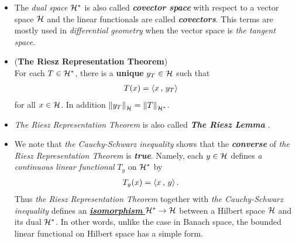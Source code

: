 \documentclass[11pt]{article}
\begin{document}
\begin{itemize}
\item \begin{remark}
The \emph{dual space} ${\mathcal H}^{*}$ is also called \emph{\textbf{covector space}} with respect to a vector space ${\mathcal H}$ and the linear functionals are called \emph{\textbf{covectors}}. This terms are mostly used in \emph{differential geometry} when the vector space is \emph{the tangent space}.
\end{remark}

\item \begin{theorem} (\textbf{The Riesz Representation Theorem}) \citep{reed1980methods, kreyszig1989introductory, conway2019course} \\
For each $T \in {\mathcal H}^{*}$, there is a \textbf{unique} $y_{T} \in {\mathcal H}$ such that 
\begin{align*}
T(x) &= \left\langle x\,,\, y_T \right\rangle
\end{align*} for all $x \in {\mathcal H}$. In addition $\left\|y_{T}\right\|_{{\mathcal H}} = \left\|T\right\|_{{\mathcal H}^{*}}$.
\end{theorem}

\item \begin{remark}
\emph{The Riesz Representation Theorem} \citep{conway2019course, kreyszig1989introductory} is also called \emph{\textbf{The Riesz Lemma}} \citep{reed1980methods}.
\end{remark}

\item \begin{remark}
We note that \emph{the Cauchy-Schwarz inequality} shows that the \emph{\textbf{converse}} of \emph{the Riesz Representation Theorem} is \emph{\textbf{true}}. Namely, each $y \in {\mathcal H}$ defines \emph{a continuous linear functional} $T_y$ on ${\mathcal H}^{*}$ by
\begin{align*}
T_y(x) &= \left\langle x\,,\, y \right\rangle.
\end{align*}
Thus \emph{the Riesz Representation Theorem} together with \emph{the Cauchy-Schwarz inequality} defines an \underline{\emph{\textbf{isomorphism}}  ${\mathcal H}^{*} \rightarrow {\mathcal H}$} between a Hilbert space ${\mathcal H}$ and its dual ${\mathcal H}^{*}$. In other words, unlike the case in Banach space, the bounded linear functional on Hilbert space has a simple form.
\end{remark}


\end{itemize}
\end{document}
